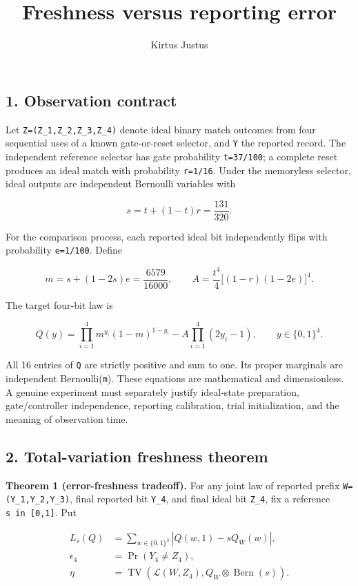 \documentclass[
  10pt,
  a4paper,
]{article}
\title{Freshness versus reporting error}
\author{Kirtus Justus}
\date{}
\begin{document}
\maketitle

\subsection{1. Observation contract}\label{observation-contract}

Let \texttt{Z=(Z\_1,Z\_2,Z\_3,Z\_4)} denote ideal binary match outcomes from four sequential uses of a known gate-or-reset selector, and \texttt{Y} the reported record. The independent reference selector has gate probability \texttt{t=37/100}; a complete reset produces an ideal match with probability \texttt{r=1/16}. Under the memoryless selector, ideal outputs are independent Bernoulli variables with

\[
 s=t+(1-t)r=\frac{131}{320}.
\]

For the comparison process, each reported ideal bit independently flips with probability \texttt{e=1/100}. Define

\[
 m=s+(1-2s)e=\frac{6579}{16000},\qquad
 A=\frac{t^4}{4}\big[(1-r)(1-2e)\big]^4.
\]

The target four-bit law is

\[
 Q(y)=\prod_{i=1}^4m^{y_i}(1-m)^{1-y_i}
       -A\prod_{i=1}^4(2y_i-1),\qquad y\in\{0,1\}^4.
\]

All 16 entries of \texttt{Q} are strictly positive and sum to one. Its proper marginals are independent Bernoulli(\texttt{m}). These equations are mathematical and dimensionless. A genuine experiment must separately justify ideal-state preparation, gate/controller independence, reporting calibration, trial initialization, and the meaning of observation time.

\subsection{2. Total-variation freshness theorem}\label{total-variation-freshness-theorem}

\textbf{Theorem 1 (error-freshness tradeoff).} For any joint law of reported prefix \texttt{W=(Y\_1,Y\_2,Y\_3)}, final reported bit \texttt{Y\_4}, and final ideal bit \texttt{Z\_4}, fix a reference \texttt{s\ in\ {[}0,1{]}}. Put

\[
 \begin{aligned}
 L_s(Q)&=\sum_{w\in\{0,1\}^3}|Q(w,1)-sQ_W(w)|,\\
 \epsilon_4&=\Pr(Y_4\ne Z_4),\\
 \eta&=\operatorname{TV}\!\left(\mathcal L(W,Z_4),
                           Q_W\otimes\operatorname{Bern}(s)\right).
 \end{aligned}
\]
\end{document}
